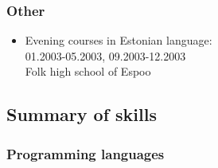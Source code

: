 \documentclass[a4paper,12pt]{article}
\begin{document}
\subsubsection*{Other}
\begin{itemize}
\item
Evening courses in Estonian language: \\
01.2003-05.2003, 09.2003-12.2003 \\
Folk high school of Espoo
\end{itemize}

\subsection*{Summary of skills}
\subsubsection*{Programming languages}
\end{document}
